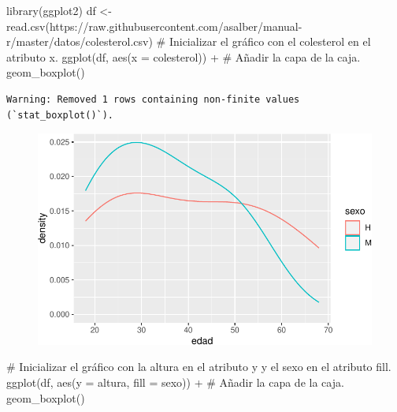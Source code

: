 \documentclass[
  a4paper,
]{scrreport}
\newenvironment{Shaded}{\begin{snugshade}}{\end{snugshade}}
\newcommand{\AttributeTok}[1]{\textcolor[rgb]{0.40,0.45,0.13}{#1}}
\newcommand{\CommentTok}[1]{\textcolor[rgb]{0.37,0.37,0.37}{#1}}
\newcommand{\FunctionTok}[1]{\textcolor[rgb]{0.28,0.35,0.67}{#1}}
\newcommand{\NormalTok}[1]{\textcolor[rgb]{0.00,0.23,0.31}{#1}}
\newcommand{\OtherTok}[1]{\textcolor[rgb]{0.00,0.23,0.31}{#1}}
\newcommand{\SpecialCharTok}[1]{\textcolor[rgb]{0.37,0.37,0.37}{#1}}
\newcommand{\StringTok}[1]{\textcolor[rgb]{0.13,0.47,0.30}{#1}}
\theoremstyle{definition}
\theoremstyle{definition}
\theoremstyle{remark}
\begin{document}
\begin{Shaded}
\begin{Highlighting}[]
\FunctionTok{library}\NormalTok{(ggplot2)}
\NormalTok{df }\OtherTok{\textless{}{-}} \FunctionTok{read.csv}\NormalTok{(}\StringTok{\textquotesingle{}https://raw.githubusercontent.com/asalber/manual{-}r/master/datos/colesterol.csv\textquotesingle{}}\NormalTok{)}
\CommentTok{\# Inicializar el gráfico con el colesterol en el atributo x.}
\FunctionTok{ggplot}\NormalTok{(df, }\FunctionTok{aes}\NormalTok{(}\AttributeTok{x =}\NormalTok{ colesterol)) }\SpecialCharTok{+}
\CommentTok{\# Añadir la capa de la caja.}
    \FunctionTok{geom\_boxplot}\NormalTok{()}
\end{Highlighting}
\end{Shaded}

\begin{verbatim}
Warning: Removed 1 rows containing non-finite values (`stat_boxplot()`).
\end{verbatim}

\begin{figure}[H]

{\centering \includegraphics{./07-graficos_files/figure-pdf/unnamed-chunk-20-1.pdf}

}

\end{figure}

\begin{Shaded}
\begin{Highlighting}[]
\CommentTok{\# Inicializar el gráfico con la altura en el atributo y y el sexo en el atributo fill.}
\FunctionTok{ggplot}\NormalTok{(df, }\FunctionTok{aes}\NormalTok{(}\AttributeTok{y =}\NormalTok{ altura, }\AttributeTok{fill =}\NormalTok{ sexo)) }\SpecialCharTok{+}
\CommentTok{\# Añadir la capa de la caja.}
    \FunctionTok{geom\_boxplot}\NormalTok{()}
\end{Highlighting}
\end{Shaded}
\end{document}
